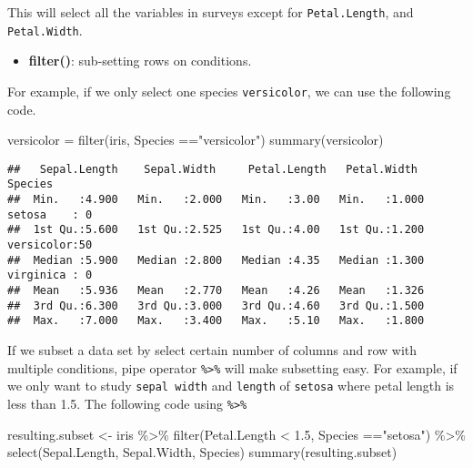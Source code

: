 \documentclass[
]{article}
\newenvironment{Shaded}{\begin{snugshade}}{\end{snugshade}}
\newcommand{\FloatTok}[1]{\textcolor[rgb]{0.00,0.00,0.81}{#1}}
\newcommand{\FunctionTok}[1]{\textcolor[rgb]{0.00,0.00,0.00}{#1}}
\newcommand{\NormalTok}[1]{#1}
\newcommand{\OtherTok}[1]{\textcolor[rgb]{0.56,0.35,0.01}{#1}}
\newcommand{\SpecialCharTok}[1]{\textcolor[rgb]{0.00,0.00,0.00}{#1}}
\newcommand{\StringTok}[1]{\textcolor[rgb]{0.31,0.60,0.02}{#1}}
\providecommand{\tightlist}{%
  \setlength{\itemsep}{0pt}\setlength{\parskip}{0pt}}
\begin{document}
This will select all the variables in surveys except for
\texttt{Petal.Length}, and \texttt{Petal.Width}.

\begin{itemize}
\tightlist
\item
  \textbf{filter()}: sub-setting rows on conditions.
\end{itemize}

For example, if we only select one species \texttt{versicolor}, we can
use the following code.

\begin{Shaded}
\begin{Highlighting}[]
\NormalTok{versicolor }\OtherTok{=} \FunctionTok{filter}\NormalTok{(iris, Species }\SpecialCharTok{==}\StringTok{"versicolor"}\NormalTok{)}
\FunctionTok{summary}\NormalTok{(versicolor)}
\end{Highlighting}
\end{Shaded}

\begin{verbatim}
##   Sepal.Length    Sepal.Width     Petal.Length   Petal.Width          Species  
##  Min.   :4.900   Min.   :2.000   Min.   :3.00   Min.   :1.000   setosa    : 0  
##  1st Qu.:5.600   1st Qu.:2.525   1st Qu.:4.00   1st Qu.:1.200   versicolor:50  
##  Median :5.900   Median :2.800   Median :4.35   Median :1.300   virginica : 0  
##  Mean   :5.936   Mean   :2.770   Mean   :4.26   Mean   :1.326                  
##  3rd Qu.:6.300   3rd Qu.:3.000   3rd Qu.:4.60   3rd Qu.:1.500                  
##  Max.   :7.000   Max.   :3.400   Max.   :5.10   Max.   :1.800
\end{verbatim}

If we subset a data set by select certain number of columns and row with
multiple conditions, pipe operator \texttt{\%\textgreater{}\%} will make
subsetting easy. For example, if we only want to study
\texttt{sepal\ width} and \texttt{length} of \texttt{setosa} where petal
length is less than 1.5. The following code using
\texttt{\%\textgreater{}\%}

\begin{Shaded}
\begin{Highlighting}[]
\NormalTok{resulting.subset }\OtherTok{\textless{}{-}}\NormalTok{ iris }\SpecialCharTok{\%\textgreater{}\%}
             \FunctionTok{filter}\NormalTok{(Petal.Length }\SpecialCharTok{\textless{}} \FloatTok{1.5}\NormalTok{, Species }\SpecialCharTok{==}\StringTok{"setosa"}\NormalTok{) }\SpecialCharTok{\%\textgreater{}\%}
             \FunctionTok{select}\NormalTok{(Sepal.Length, Sepal.Width, Species)}
\FunctionTok{summary}\NormalTok{(resulting.subset)}
\end{Highlighting}
\end{Shaded}
\end{document}
